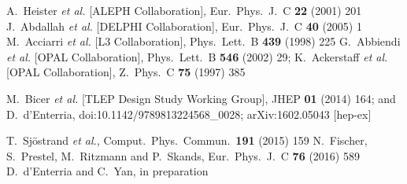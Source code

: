 \documentclass{moriond}
\begin{document}
\begin{thebibliography}{99}
 A.~Heister {\it et al.} [ALEPH Collaboration], Eur.\ Phys.\ J.\ C {\bf 22} (2001) 201
 J.~Abdallah {\it et al.} [DELPHI Collaboration], Eur.\ Phys.\ J.\ C {\bf 40} (2005) 1
 M.~Acciarri {\it et al.} [L3 Collaboration],  Phys.\ Lett.\ B {\bf 439} (1998) 225
 G.~Abbiendi {\it et al.} [OPAL Collaboration],  Phys.\ Lett.\ B {\bf 546} (2002) 29;
K.~Ackerstaff {\it et al.} [OPAL Collaboration],  Z.\ Phys.\ C {\bf 75} (1997) 385

M.~Bicer {\it et al.} [TLEP Design Study Working Group], JHEP {\bf 01} (2014) 164;
and D.~d'Enterria, doi:10.1142/9789813224568\_0028; arXiv:1602.05043 [hep-ex] %

T.~Sj\"ostrand {\it et al.}, Comput.\ Phys.\ Commun.\  {\bf 191} (2015) 159
N.~Fischer, S.~Prestel, M.~Ritzmann and P.~Skands,  Eur.\ Phys.\ J.\ C {\bf 76} (2016) 589
D.~d'Enterria and C.~Yan, in preparation
\end{thebibliography}
\end{document}
